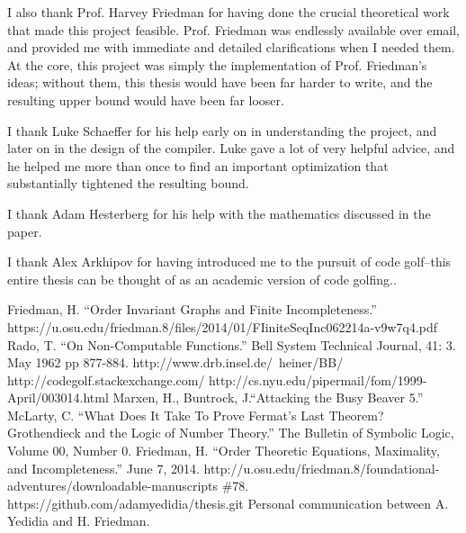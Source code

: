 \documentclass[11pt]{report}
\begin{document}
I also thank Prof. Harvey Friedman for having done the crucial theoretical work that made this project feasible. Prof. Friedman was endlessly available over email, and provided me with immediate and detailed clarifications when I needed them. At the core, this project was simply the implementation of Prof. Friedman's ideas; without them, this thesis would have been far harder to write, and the resulting upper bound would have been far looser.

I thank Luke Schaeffer for his help early on in understanding the project, and later on in the design of the compiler. Luke gave a lot of very helpful advice, and he helped me more than once to find an important optimization that substantially tightened the resulting bound.

I thank Adam Hesterberg for his help with the mathematics discussed in the paper.

I thank Alex Arkhipov for having introduced me to the pursuit of code golf--this entire thesis can be thought of as an academic version of code golfing..


\begin{thebibliography}{100}
 Friedman, H. ``Order Invariant Graphs and Finite Incompleteness.'' https://u.osu.edu/friedman.8/files/2014/01/FIiniteSeqInc062214a-v9w7q4.pdf
 Rado, T. ``On Non-Computable Functions.'' 
Bell System Technical Journal, 41: 3. May 1962 pp 877-884.
 http://www.drb.insel.de/~heiner/BB/
 http://codegolf.stackexchange.com/
 http://cs.nyu.edu/pipermail/fom/1999-April/003014.html
 Marxen, H., Buntrock, J.``Attacking the Busy Beaver 5.'' 
 McLarty, C. ``What Does It Take To Prove Fermat's Last Theorem? Grothendieck and the Logic of Number Theory.'' The Bulletin of Symbolic Logic, Volume 00, Number 0.
 Friedman, H. ``Order Theoretic Equations, Maximality, and Incompleteness.'' June 7, 2014. http://u.osu.edu/friedman.8/foundational-adventures/downloadable-manuscripts \#78.
 https://github.com/adamyedidia/thesis.git
 Personal communication between A. Yedidia and H. Friedman.
\end{thebibliography}
\end{document}
